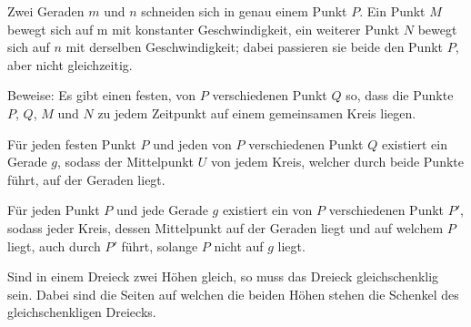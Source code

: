 \documentclass[10pt, a4paper, reqno]{amsart}
\begin{document}
\newpage
\begin{aufgabe}
  Zwei Geraden $m$ und $n$ schneiden sich in genau einem Punkt $P$. Ein Punkt
  $M$ bewegt sich auf m mit konstanter Geschwindigkeit, ein weiterer Punkt $N$
  bewegt sich auf $n$ mit derselben Geschwindigkeit; dabei passieren sie beide
  den Punkt $P$, aber nicht gleichzeitig.
 
  Beweise: Es gibt einen festen, von $P$ verschiedenen Punkt $Q$ so, dass die
  Punkte
  $P$, $Q$, $M$ und $N$ zu jedem Zeitpunkt auf einem gemeinsamen Kreis liegen.\\
\end{aufgabe}
\begin{lemma}\label{sec3:lemma1}
  Für jeden festen Punkt $P$ und jeden von $P$ verschiedenen Punkt $Q$ existiert ein Gerade $g$, sodass
  der Mittelpunkt $U$ von jedem Kreis, welcher durch beide Punkte führt, auf der
  Geraden liegt.
\end{lemma}
\begin{lemma}\label{sec3:lemma3}
  Für jeden Punkt $P$ und jede Gerade $g$ existiert ein von $P$ verschiedenen Punkt $P'$, sodass jeder
  Kreis, dessen Mittelpunkt auf der Geraden liegt und auf welchem $P$ liegt,
  auch durch $P'$ führt, solange $P$ nicht auf $g$ liegt.
\end{lemma}
\begin{lemma}\label{sec3:lemma2}
  Sind in einem Dreieck zwei Höhen gleich, so muss das Dreieck gleichschenklig
  sein. Dabei sind die Seiten auf welchen die beiden Höhen stehen die Schenkel des
  gleichschenkligen Dreiecks.
\end{lemma}
\end{document}
